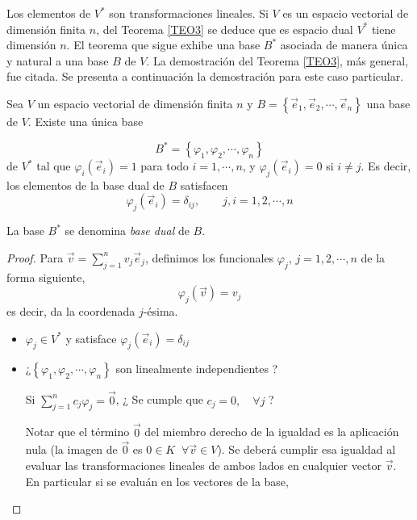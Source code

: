 Los elementos de $V^*$ son transformaciones lineales. Si $V$ es un espacio vectorial de dimensión finita $n$, del  Teorema \ref{TEO3} se deduce que es espacio dual $V^*$  tiene dimensión $n$. El teorema que sigue exhibe una base $B^{*}$ asociada de manera única  y natural a una base $B$ de $V$. La demostración del  Teorema \ref{TEO3}, más general, fue citada. Se presenta a continuación la demostración para este caso particular.

\bigskip

\bigskip


\begin{corollary}
\label{basedual}
Sea $V$ un espacio vectorial de dimensión finita $n$ y  $B= \left\{\vec{e}_1,\vec{e}_2,\cdots, \vec{e}_n\right\}$ una base de  $V$. Existe una única base 

$$B^*= \left\{\varphi_1,\varphi_2,\cdots,\varphi_n\right\}$$
de $V^*$ tal que $\varphi_i(\vec{e}_i)=1$ para todo $i=1, \cdots,n$,   y $\varphi_j(\vec{e}_i)=0$  si $i\neq j$. 
Es decir, los elementos de la base dual de  $B$ satisfacen 
 $$\varphi_j(\vec{e}_i)= \delta_{ij}, \qquad j,i= 1,2, \cdots, n  $$
 
 
La base $B^*$  se denomina \textit{base dual} de $B$.



\bigskip

\begin{proof}
Para $ \vec{v}= \sum_{j=1}^n   v_j \vec{e}_j$,  definimos los funcionales  $\varphi_j$, $j=1,2, \cdots, n$ de la forma siguiente, 
$$ \varphi_j( \vec{v})=v_j  $$
\noindent
es decir, da la coordenada $j$-ésima.

\bigskip 


\begin{itemize}
\item
$\varphi_j  \in V^* $  y satisface $\varphi_j(\vec{e}_i)= \delta_{ij}$

\item
 ¿$\left\{\varphi_1,\varphi_2,\cdots, \varphi_n \right\}$ son linealmente independientes ?
 
 \bigskip
 
 Si $ \sum_{j=1}^n  c_j \varphi_j = \vec{0}   $,  ¿ Se cumple que $c_j = 0, \quad \forall j$ ?
 
\bigskip 

Notar que el término $\vec{0}$ del miembro derecho de la igualdad  es la aplicación nula (la imagen de $\vec{0}$ es $0 \in K$  $ ~\forall \vec{v} \in V$). Se deberá cumplir  esa igualdad  al evaluar  las transformaciones lineales de ambos lados en cualquier vector $\vec{v}$. En particular si se evaluán en los vectores de la base,
 

\end{itemize}
\end{proof}
\end{corollary}
